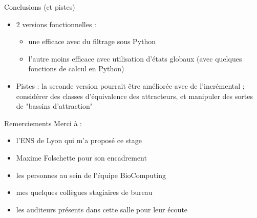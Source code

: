 \documentclass{beamer}
\begin{document}
\begin{frame}{Conclusions (et pistes)}
	\begin{itemize}
		\pause
		\item 2 versions fonctionnelles :
		\begin{itemize}
			\item une efficace avec du filtrage sous Python
			\item l'autre moins efficace avec utilisation d'états globaux (avec quelques fonctions de calcul en Python)
		\end{itemize}
		\pause
		\item Pistes : la seconde version pourrait être améliorée avec de l'incrémental ; considérer des classes d'équivalence des attracteurs, et manipuler des sortes de "bassins d'attraction"
	\end{itemize}
\end{frame}

\begin{frame}{Remerciements}
	Merci à :
	\begin{itemize}
		\item l'ENS de Lyon qui m'a proposé ce stage
		\item Maxime Folschette pour son encadrement
		\item les personnes au sein de l'équipe BioComputing
		\item mes quelques collègues stagiaires de bureau
		\item les auditeurs présents dans cette salle pour leur écoute
	\end{itemize}
\end{frame}
\end{document}
